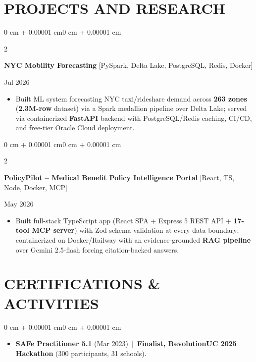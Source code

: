 \documentclass[10pt, letterpaper]{article}
\newenvironment{highlights}{
    \begin{itemize}[
        topsep=0.10 cm,
        parsep=0.06 cm,
        partopsep=0pt,
        itemsep=0.06 cm,
        leftmargin=12pt
    ]
}{
    \end{itemize}
}
\newenvironment{onecolentry}{
    \begin{adjustwidth}{0 cm + 0.00001 cm}{0 cm + 0.00001 cm}
}{
    \end{adjustwidth}
}
\newenvironment{twocolentry}[2][]{
    \onecolentry
    \def\secondColumn{#2}
    \setcolumnwidth{\fill, 4.5 cm}
    \begin{paracol}{2}
}{
    \switchcolumn \raggedleft \secondColumn
    \end{paracol}
    \endonecolentry
}
\begin{document}
\section{PROJECTS AND RESEARCH}
\begin{twocolentry}{Jul 2026}
\textbf{NYC Mobility Forecasting} [PySpark, Delta Lake, PostgreSQL, Redis, Docker]
\end{twocolentry}
\begin{highlights}
  \item Built ML system forecasting NYC taxi/rideshare demand across \textbf{263 zones} (\textbf{2.3M-row} dataset) via a Spark medallion pipeline over Delta Lake; served via containerized \textbf{FastAPI} backend with PostgreSQL/Redis caching, CI/CD, and free-tier Oracle Cloud deployment.
\end{highlights}

\vspace{0.12 cm}

\begin{twocolentry}{May 2026}
\textbf{PolicyPilot -- Medical Benefit Policy Intelligence Portal} [React, TS, Node, Docker, MCP]
\end{twocolentry}
\begin{highlights}
  \item Built full-stack TypeScript app (React SPA + Express 5 REST API + \textbf{17-tool MCP server}) with Zod schema validation at every data boundary; containerized on Docker/Railway with an evidence-grounded \textbf{RAG pipeline} over Gemini 2.5-flash forcing citation-backed answers.
\end{highlights}

\section{CERTIFICATIONS \& ACTIVITIES}
\begin{onecolentry}
\begin{highlights}
  \item \textbf{SAFe Practitioner 5.1} (Mar 2023) \,|\, \textbf{Finalist, RevolutionUC 2025 Hackathon} (300 participants, 31 schools).
\end{highlights}
\end{onecolentry}
\end{document}
